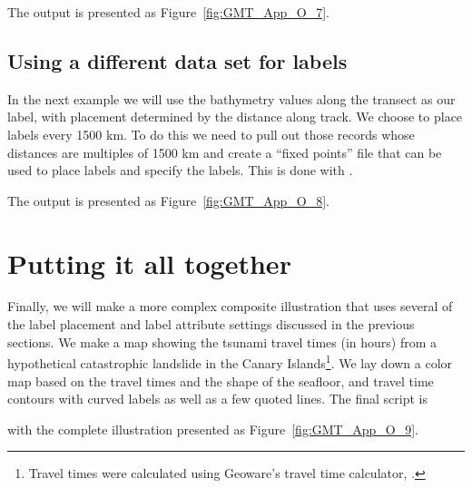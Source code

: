

\noindent
The output is presented as Figure~\ref{fig:GMT_App_O_7}.


\subsection{Using a different data set for labels}

In the next example we will use the bathymetry values along the transect as
our label, with placement determined by the distance along track.  We choose
to place labels every 1500 km.  To do this we need to pull out those records
whose distances are multiples of 1500 km and create a ``fixed points'' file
that can be used to place labels and specify the labels.  This is done with
.



\noindent
The output is presented as Figure~\ref{fig:GMT_App_O_8}.


\section{Putting it all together}

Finally, we will make a more complex composite illustration that uses several of the
label placement and label attribute settings discussed in the previous sections.  We
make a map showing the tsunami travel times (in hours) from a hypothetical catastrophic
landslide in the Canary Islands\footnote{Travel times were calculated using Geoware's
travel time calculator, .}.  We lay down a color map based on the travel times
and the shape of the seafloor, and travel time contours with curved labels as well
as a few quoted lines.  The final script is



\noindent
with the complete illustration presented as Figure~\ref{fig:GMT_App_O_9}.
